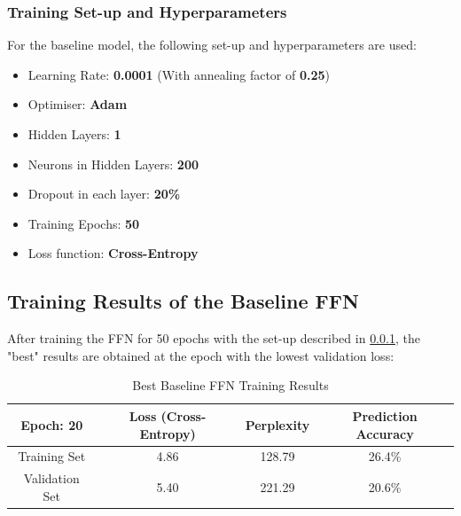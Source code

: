 \documentclass[sigconf,nonacm=true]{acmart}
\begin{document}
\subsubsection{Training Set-up and Hyperparameters} \label{subsubsection:baselinesetup}
For the baseline model, the following set-up and hyperparameters are used:
\begin{itemize}
	\item Learning Rate: \textbf{0.0001} (With annealing factor of \textbf{0.25})
	\item Optimiser: \textbf{Adam}
	\item Hidden Layers: \textbf{1}
	\item Neurons in Hidden Layers: \textbf{200}
	\item Dropout in each layer: \textbf{20\%}
	\item Training Epochs: \textbf{50}
	\item Loss function: \textbf{Cross-Entropy}
\end{itemize}

\subsection{Training Results of the Baseline FFN}
\label{subsection:baselineresults}
After training the FFN for 50 epochs with the set-up described in 
\ref{subsubsection:baselinesetup}, the "best" results are obtained at the epoch
with the lowest validation loss:  

\begin{table}[H]
	\label{tab:freq}
	\begin{adjustbox}{width=\columnwidth}
	\begin{tabular}{cccc}
		\toprule
		Epoch: 20&Loss (Cross-Entropy)&Perplexity&Prediction Accuracy\\
		\midrule
		Training Set & 4.86 & 128.79 & 26.4\% \\
		Validation Set & 5.40 & 221.29 & 20.6\% \\
		\bottomrule
	\end{tabular}
	\end{adjustbox}
	\caption{Best Baseline FFN Training Results}
\end{table}
\end{document}
